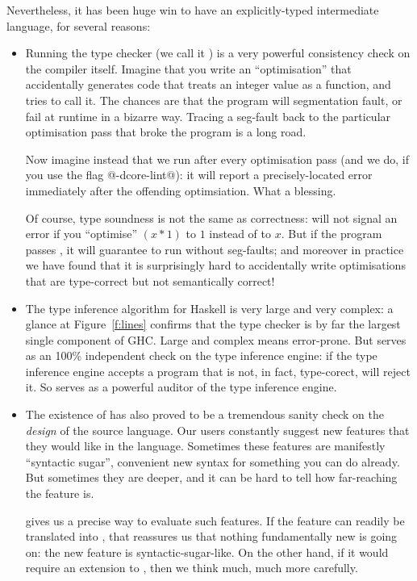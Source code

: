 \documentclass{article}
\begin{document}
Nevertheless, it has been huge win to have an explicitly-typed intermediate language, for several reasons:
\begin{itemize}
\item Running the \Core{} type checker (we call it \Lint{}) is a very powerful consistency check on the compiler itself.  Imagine that you write an ``optimisation'' that accidentally generates code that treats an integer value as a function, and tries to call it.  The chances are that the program will segmentation fault, or fail at runtime in a bizarre way. Tracing a seg-fault back to the particular optimisation pass that broke the program is a long road.

Now imagine instead that we run \Lint{} after every optimisation pass (and we do, if you use the flag @-dcore-lint@):
it will report a precisely-located error immediately after the
offending optimsiation.  What a blessing.  

Of course, type soundness is not the same as correctness: \Lint{} will
not signal an error if you ``optimise'' $(x*1)$ to $1$ instead of to
$x$.  But if the program passes \Lint{}, it will guarantee to run without seg-faults; and moreover in practice we have found that it is surprisingly hard to accidentally write optimisations that are type-correct but not semantically correct!

\item The type inference algorithm for Haskell is very large and very
      complex: a glance at Figure~\ref{f:lines} confirms that the type
      checker is by far the largest single component of GHC.  Large
      and complex means error-prone.  But \Lint{} serves as an 100\%
      independent check on the type inference engine: if the type
      inference engine accepts a program that is not, in fact,
      type-corect, \Lint{} will reject it. So \Lint{} serves as a 
      powerful auditor of the type inference engine.

\item The existence of \Core{} has also proved to be a tremendous
      sanity check on the \emph{design} of the source language.  Our
      users constantly suggest new features that they would like in
      the language. Sometimes these features are manifestly
      ``syntactic sugar'', convenient new syntax for something you can
      do already. But sometimes they are deeper, and it can be hard to
      tell how far-reaching the feature is.

\Core{} gives us a precise way to evaluate such features.  If the
feature can readily be translated into \Core{}, that reassures us that
nothing fundamentally new is going on: the new feature is syntactic-sugar-like. On the other hand, if it would require an extension to \Core, then we think much, much more carefully.  
\end{itemize}
\end{document}
